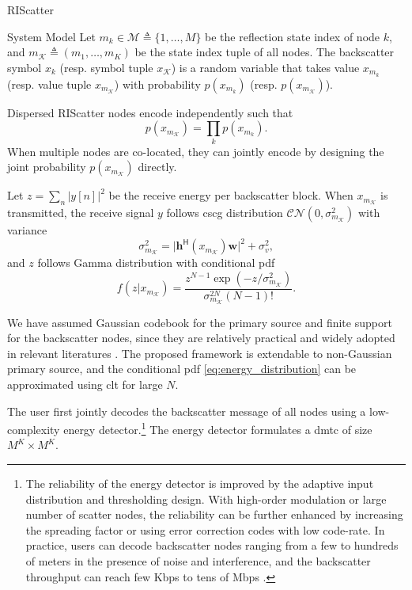 \begin{section}{RIScatter}
\begin{subsection}{System Model}
		Let $m_k \in \mathcal{M} \triangleq \{1,\ldots,M\}$ be the reflection state index of node $k$, and $m_{\mathcal{K}} \triangleq (m_1,\ldots,m_K)$ be the state index tuple of all nodes.
		The backscatter symbol $x_k$ (resp. symbol tuple $x_{\mathcal{K}}$) is a random variable that takes value $x_{m_k}$ (resp. value tuple $x_{m_{\mathcal{K}}}$) with probability $p(x_{m_k})$ (resp. $p(x_{m_{\mathcal{K}}})$).
		\begin{remark}
			Dispersed RIScatter nodes encode independently such that
			\begin{equation}
				p(x_{m_{\mathcal{K}}}) = \prod_k p(x_{m_k}).
				\label{eq:equivalent_distribution}
			\end{equation}
			When multiple nodes are co-located, they can jointly encode by designing the joint probability $p(x_{m_{\mathcal{K}}})$ directly.
			\label{re:independent_encoding}
		\end{remark}

		Let $z=\sum_{n} \bigl\lvert y[n] \bigr\rvert^2$ be the receive energy per backscatter block.
		When $x_{m_\mathcal{K}}$ is transmitted, the receive signal $y$ follows \gls{cscg} distribution $\mathcal{CN}(0,\sigma_{m_{\mathcal{K}}}^2)$ with variance
		\begin{equation}
			\sigma_{m_{\mathcal{K}}}^2 = \lvert \boldsymbol{h}^\mathsf{H}(x_{m_{\mathcal{K}}}) \boldsymbol{w} \rvert^2 + \sigma_v^2,
			\label{eq:receive_variance}
		\end{equation}
		and $z$ follows Gamma distribution with conditional \gls{pdf}
		\begin{equation}
			f(z|x_{m_{\mathcal{K}}}) = \frac{z^{N-1} \exp(-z/\sigma_{m_{\mathcal{K}}}^2)}{\sigma_{m_{\mathcal{K}}}^{2N} (N-1)!}.
			\label{eq:energy_distribution}
		\end{equation}

		\begin{remark}
			We have assumed Gaussian codebook for the primary source and finite support for the backscatter nodes, since they are relatively practical and widely adopted in relevant literatures \cite{Qian2019b,Xu2020b,Zhang2021d,Hua2022,Hu2021a,Qian2019}.
			The proposed framework is extendable to non-Gaussian primary source, and the conditional \gls{pdf} \eqref{eq:energy_distribution} can be approximated using \gls{clt} for large $N$.
			\label{re:non_gaussian}
		\end{remark}

		The user first jointly decodes the backscatter message of all nodes using a low-complexity energy detector.\footnote{The reliability of the energy detector is improved by the adaptive input distribution and thresholding design. With high-order modulation or large number of scatter nodes, the reliability can be further enhanced by increasing the spreading factor or using error correction codes with low code-rate. In practice, users can decode backscatter nodes ranging from a few to hundreds of meters in the presence of noise and interference, and the backscatter throughput can reach few Kbps to tens of Mbps \cite{Wu2022e}.\label{fn:energy_detector}}
		The energy detector formulates a \gls{dmtc} of size $M^K \times M^K$.


\end{subsection}
\end{section}
